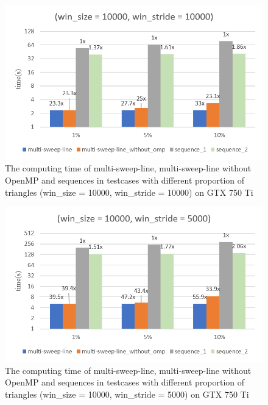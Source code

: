 \begin{figure}[!h]
    \centering
    \includegraphics[scale=0.7]{image/fig_5_11}
    \caption{The computing time of multi-sweep-line, multi-sweep-line without OpenMP and sequences in testcases with different proportion of triangles (win\_size = 10000, win\_stride = 10000) on GTX 750 Ti}
    \label{fig:fig_5_11}
\end{figure}

\begin{figure}[!h]
    \centering
    \includegraphics[scale=0.7]{image/fig_5_12}
    \caption{The computing time of multi-sweep-line, multi-sweep-line without OpenMP and sequences in testcases with different proportion of triangles (win\_size = 10000, win\_stride = 5000) on GTX 750 Ti}
    \label{fig:fig_5_12}
\end{figure}

